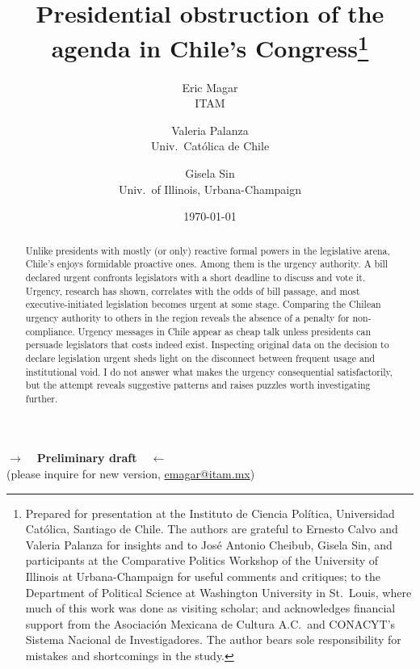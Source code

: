 \documentclass[letter,12pt]{article}
\begin{document}
\title{Presidential obstruction of the \\agenda in Chile's Congress\thanks{Prepared for presentation at the Instituto de Ciencia Pol\'itica, Universidad Cat\'olica, Santiago de Chile. The authors are grateful to Ernesto Calvo and Valeria Palanza for insights and to Jos\'e Antonio Cheibub, Gisela Sin, and participants at the Comparative Politics Workshop of the University of Illinois at Urbana-Champaign for useful comments and critiques; to the Department of Political Science at Washington University in St.\ Louis, where much of this work was done as visiting scholar; and acknowledges financial support from the Asociaci\'on Mexicana de Cultura A.C.\ and CONACYT's Sistema Nacional de Investigadores. The author bears sole responsibility for mistakes and shortcomings in the study.}}
\author{Eric Magar \\ ITAM \and
        Valeria Palanza \\ Univ.\ Cat\'olica de Chile \and  
        Gisela Sin \\ Univ.\ of Illinois, Urbana-Champaign 
}
\date{\today}
\maketitle

\begin{center} \textbf{$\rightarrow$~~Preliminary draft~~$\leftarrow$} \\ (please inquire for new version, \small{\url{emagar@itam.mx}})  \end{center}

\begin{abstract}
\noindent Unlike presidents with mostly (or only) reactive formal powers in the legislative arena, Chile's enjoys formidable proactive ones. Among them is the urgency authority. A bill declared urgent confronts legislators with a short deadline to discuss and vote it. Urgency, research has shown, correlates with the odds of bill passage, and most executive-initiated legislation becomes urgent at some stage. Comparing the Chilean urgency authority to others in the region reveals the absence of a penalty for non-compliance. Urgency messages in Chile appear as cheap talk unless presidents can persuade legislators that costs indeed exist. Inspecting original data on the decision to declare legislation urgent sheds light on the disconnect between frequent usage and institutional void. I do not answer what makes the urgency consequential satisfactorily, but the attempt reveals suggestive patterns and raises puzzles worth investigating further. 
\end{abstract}
\end{document}

